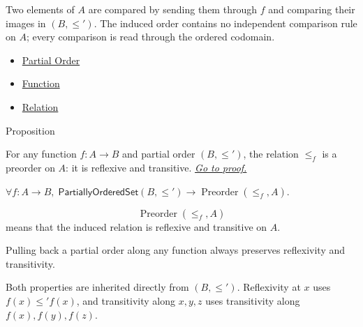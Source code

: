 \begin{remark*}[Exposition]
Two elements of $A$ are compared by sending them through $f$ and comparing
their images in $(B, \leq')$. The induced order contains no independent
comparison rule on $A$; every comparison is read through the ordered codomain.
\end{remark*}

\begin{dependencies}
\begin{itemize}
  \item \hyperref[def:partial-order]{Partial Order}
  \item \hyperref[def:function]{Function}
  \item \hyperref[def:relation]{Relation}
\end{itemize}
\end{dependencies}


\begin{propositionbox}{Proposition}
\begin{proposition}\label{prop:induced-preorder}
For any function $f : A \to B$ and partial order $(B, \leq')$, the relation
$\leq_f$ is a preorder on $A$: it is reflexive and transitive.
\hyperref[prf:induced-preorder]{\textit{Go to proof.}}
\end{proposition}
\end{propositionbox}

\begin{remark*}
$\forall f:A\to B,\; \mathsf{PartiallyOrderedSet}(B,\leq') \to
\operatorname{Preorder}(\leq_f,A)$.
\end{remark*}

\begin{remark*}
\[
  \operatorname{Preorder}(\leq_f,A)
\] means that the induced relation is
reflexive and transitive on $A$.
\end{remark*}

\begin{remark*}[Interpretation]
Pulling back a partial order along any function always preserves reflexivity
and transitivity.
\end{remark*}

\begin{remark*}[Exposition]
Both properties are inherited directly from $(B,\leq')$. Reflexivity at $x$
uses $f(x)\leq' f(x)$, and transitivity along $x,y,z$ uses transitivity along
$f(x),f(y),f(z)$.
\end{remark*}

